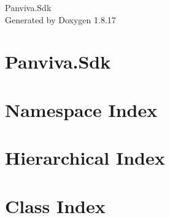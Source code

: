 \let\mypdfximage\pdfximage\def\pdfximage{\immediate\mypdfximage}\documentclass[twoside]{book}
\newcommand{\+}{\discretionary{\mbox{\scriptsize$\hookleftarrow$}}{}{}}
\newcommand{\clearemptydoublepage}{%
  \newpage{\pagestyle{empty}\cleardoublepage}%
}
\begin{document}
\hypersetup{pageanchor=false,
             bookmarksnumbered=true,
             pdfencoding=unicode
            }
\begin{titlepage}
\vspace*{7cm}
\begin{center}%
{\Large Panviva.\+Sdk }\\
\vspace*{1cm}
{\large Generated by Doxygen 1.8.17}\\
\end{center}
\end{titlepage}
\clearemptydoublepage
{}
\tableofcontents
\clearemptydoublepage
{}
\hypersetup{pageanchor=true}

\chapter{Panviva.\+Sdk}
\label{md__c_1__users_cshehan_source_public-repo-panviva_panviva-sdk-dotnet__r_e_a_d_m_e}

\chapter{Namespace Index}

\chapter{Hierarchical Index}

\chapter{Class Index}

\end{document}
